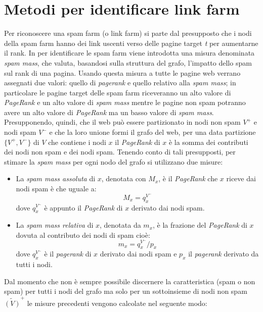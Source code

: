 \section{Metodi per identificare link farm}
Per riconoscere una spam farm (o link farm) si parte dal presupposto che i nodi della spam farm hanno dei link uscenti verso delle pagine target \textit{t} per aumentarne il rank. In \cite{Gyongyi:2006:LSD:1182635.1164166} per identificare le spam farm viene introdotta una misura denominata \textit{spam mass}, che valuta, basandosi sulla struttura del grafo, l'impatto dello spam sul rank di una pagina. Usando questa misura a tutte le pagine web verrano assegnati due valori: quello di \textit{pagerank} e quello relativo alla \textit{spam mass}; in particolare le pagine target delle spam farm riceveranno  un alto valore di \textit{PageRank} e un alto valore di \textit{spam mass} mentre le pagine non spam potranno  avere un alto valore di \textit{PageRank} ma un basso valore di \textit{spam mass}. Presupponendo, quindi, che il web può essere partizionato in nodi non spam \(V^+\) e nodi spam \(V^-\) e che la loro unione formi il grafo del web, per una data partizione \(\{V^+,V^-\}\) di \(V\) che contiene i nodi \(x\) il \textit{PageRank} di \(x\) è la somma dei contributi dei nodi non spam e dei nodi spam. Tenendo conto di tali presupposti, per stimare la \textit{spam mass} per ogni nodo del grafo si utilizzano due misure:
\begin{itemize}
 \item La \textit{spam mass assoluta} di \(x\), denotata con \(M_x\), è il \textit{PageRank} che \(x\) riceve dai nodi spam è che uguale a:
 \begin{equation}
   M_x=q_x^{V^-}
 \end{equation}
dove \(q_x^{V^-}\) è appunto il \textit{PageRank} di \(x\) derivato dai nodi spam.
 \item La \textit{spam mass relativa} di \(x\), denotata da \(m_x\), è la frazione del \textit{PageRank} di \(x\) dovuta al contributo dei nodi di spam cioè: 
 \begin{equation}
   m_x=q_x^{V^-}/p_x
 \end{equation}
dove \(q_x^{V^-}\) è il \textit{pagerank} di \(x\) derivato dai nodi spam e \(p_x\) il \textit{pagerank} derivato da tutti i nodi.
\end{itemize}
Dal momento che non è sempre possibile discernere la caratteristica (spam o non spam) per tutti i nodi del grafo ma solo per un sottoinsieme di nodi non spam \(\tilde{(V)}^+\) le misure precedenti vengono calcolate nel seguente modo:
